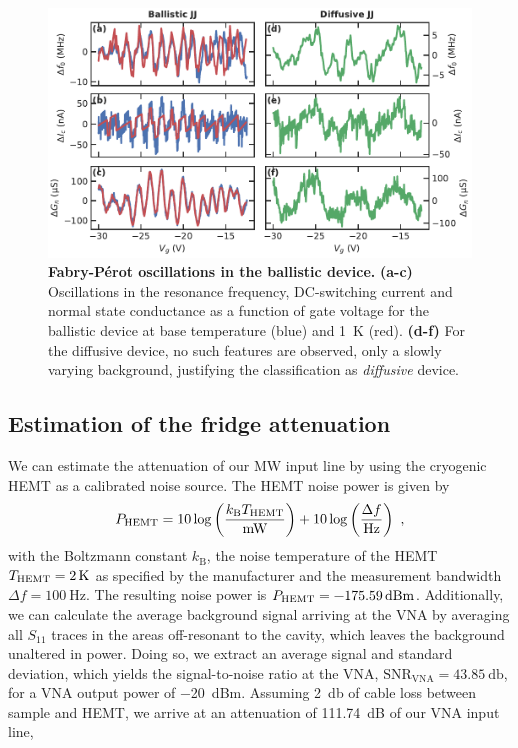 \begin{figure}[!h]
	\centering
	\includegraphics[width=\linewidth]{chapter-gJJ-CPR/figs/SMFigure-ballistic}
	\caption{
		\textbf{Fabry-Pérot oscillations in the ballistic device.}
		\textbf{(a-c)} Oscillations in the resonance frequency, DC-switching current and normal state conductance as a function of gate voltage for the ballistic device at base temperature (blue) and \SI{1}{\kelvin} (red).
		\textbf{(d-f)} For the diffusive device, no such features are observed, only a slowly varying background, justifying the classification as \textit{diffusive} device.
	}
	\label{CPRfig:SMFig-ballistic}
\end{figure}



\subsection{Estimation of the fridge attenuation}\label{sec:SMattenuation}

We can estimate the attenuation of our MW input line by using the cryogenic HEMT as a calibrated noise source.
%
The HEMT noise power is given by
%
\begin{align}
P_{\rm HEMT}=10\log\left(\frac{k_\text{B} T_{\rm HEMT}}{\si{\milli\watt}}\right) + 10\log\left(\frac{\Delta f}{\si{\hertz}}\right)\ ,
\label{CPReq:HEMT}
\end{align}
%
with the Boltzmann constant $k_\text{B}$, the noise temperature of the HEMT $T_{\rm HEMT}=\SI{2}{\kelvin}$ as specified by the manufacturer and the measurement bandwidth $\Delta f=\SI{100}{\hertz}$.
%
The resulting noise power is $P_{\rm HEMT}=\SI{-175.59}{dBm}$.
%
Additionally, we can calculate the average background signal arriving at the VNA by averaging all $S_{11}$ traces in the areas off-resonant to the cavity, which leaves the background unaltered in power.
%
Doing so, we extract an average signal and standard deviation, which yields the signal-to-noise ratio at the VNA, $\text{SNR}_\text{VNA}=\SI{43.85}{\decibel}$, for a VNA output power of \SI{-20}{dBm}.
%
Assuming \SI{2}{\decibel} of cable loss between sample and HEMT, we arrive at an attenuation of \SI{111.74}{dB} of our VNA input line,

